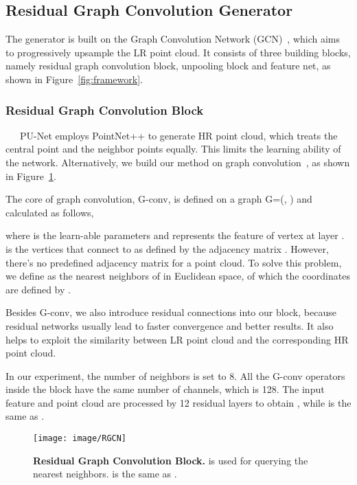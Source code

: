 \documentclass[10pt,twocolumn,letterpaper]{article}
\begin{document}
\subsection{Residual Graph Convolution Generator}
The generator  is built on the Graph Convolution Network (GCN)~\cite{bronstein2017geometric}, which aims to progressively upsample the LR point cloud.
It consists of three building blocks, namely residual graph convolution block, unpooling block and feature net, as shown in Figure~\ref{fig:framework}.

\subsubsection{Residual Graph Convolution Block}
~~~PU-Net employs PointNet++ to generate HR point cloud, which treats the central point and the neighbor points equally.
This limits the learning ability of the network.
Alternatively, we build our method on graph convolution~\cite{bronstein2017geometric}, as shown in Figure~\ref{fig:rgcn}.

The core of graph convolution, G-conv, is defined on a graph G=(, ) and calculated as follows,

where  is the learn-able parameters and  represents the feature of vertex  at layer .
 is the vertices that connect to  as defined by the adjacency matrix .
However, there's no predefined adjacency matrix for a point cloud.
To solve this problem, we define  as the  nearest neighbors of  in Euclidean space, of which the coordinates are defined by .

Besides G-conv, we also introduce residual connections into our block, because residual networks usually lead to faster convergence and better results.
It also helps to exploit the similarity between LR point cloud and the corresponding HR point cloud.

In our experiment, the number of neighbors  is set to 8.
All the G-conv operators inside the block have the same number of channels, which is 128.
The input feature  and point cloud  are processed by 12 residual layers to obtain , while  is the same as .

\begin{figure}
\begin{center}
    \texttt{[image: image/RGCN]}
\end{center}
	\vspace{-1.5em}
	\caption{\textbf{Residual Graph Convolution Block.}  is used for querying the  nearest neighbors.  is the same as .}
	\vspace{-1em}
	\label{fig:rgcn}
\end{figure}
\end{document}
